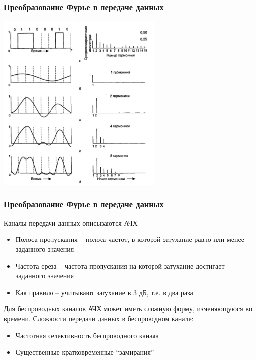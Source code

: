 \documentclass[utf8]{beamer}
\begin{document}
\begin{frame}
\frametitle{Преобразование Фурье в передаче данных}
\begin{center}
\includegraphics[width=0.6\textwidth]{pic/fourier.png}
\end{center}
\end{frame}
\begin{frame}
\frametitle{Преобразование Фурье в передаче данных}
Каналы передачи данных описываются АЧХ
\begin{itemize}
	\item Полоса пропускания – полоса частот, в которой затухание равно или менее заданного значения
	\item Частота среза – частота пропускания на которой затухание достигает заданного значения
	\item Как правило – учитывают затухание в 3 дБ, т.е. в два раза
\end{itemize}
Для беспроводных каналов АЧХ может иметь сложную форму, изменяющуюся во времени. Сложности передачи данных в беспроводном канале:
\begin{itemize}
	\item Частотная селективность беспроводного канала
	\item Существенные кратковременные ``замирания''
\end{itemize}
\end{frame}
\end{document}
